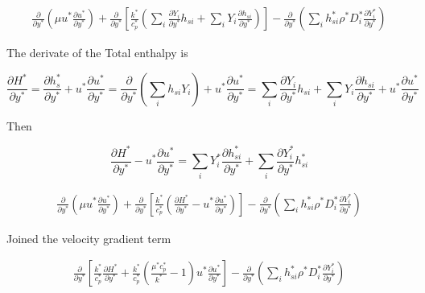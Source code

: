 \begin{equation*} 
\begin{split} 
\frac{\partial}{\partial y^*}
\left(
    \mu
    u^*
    \frac{\partial u^*}{\partial y^*}
\right)
+
\frac{\partial}{\partial y^*}
\left[
    \frac{k^*}{c_p^*}
    \left(
        \sum_i
        \frac{\partial Y_i}{\partial y^*}
        h_{si}
        +
        \sum_i
        Y_i
        \frac{\partial h_{si} }{\partial y^*}
    \right)
\right]
-
\frac{\partial}{\partial y^*}
\left(
        \sum_i
        h_{si}^*
        \rho^* 
        D_i^*
        \frac{\partial Y_i^*}{\partial y^*}
\right)
\end{split} 
\end{equation*} 

The derivate of the Total enthalpy is 

\begin{equation*} 
\frac{\partial H^*}{\partial y^*}
=
\frac{\partial h_{s}^*}{\partial y^*}
+
u^*
\frac{\partial u^*}{\partial y^*}
=
\frac{\partial }{\partial y^*}
\left(
    \sum_ih_{si}Y_i
\right)
+
u^*
\frac{\partial u^*}{\partial y^*}
=
\sum_i
\frac{\partial Y_i}{\partial y^*}
h_{si}
+
\sum_i
Y_i
\frac{\partial h_{si} }{\partial y^*}
+
u^*
\frac{\partial u^*}{\partial y^*}
\end{equation*} 

Then 

\begin{equation*} 
\frac{\partial H^*}{\partial y^*}
-
u^*
\frac{\partial u^*}{\partial y^*}
=
\sum_i
Y_i^*
\frac{\partial h_{si}^* }{\partial y^*}
+
\sum_i
\frac{\partial Y_i^*}{\partial y^*}
h_{si}^*
\end{equation*} 


\begin{equation*} 
\begin{split} 
\frac{\partial}{\partial y^*}
\left(
    \mu
    u^*
    \frac{\partial u^*}{\partial y^*}
\right)
+
\frac{\partial}{\partial y^*}
\left[
    \frac{k^*}{c_p^*}
    \left(
        \frac{\partial H^*}{\partial y^*}
        -
        u^*
        \frac{\partial u^*}{\partial y^*}
    \right)
\right]
-
\frac{\partial}{\partial y^*}
\left(
        \sum_i
        h_{si}^*
        \rho^* 
        D_i^*
        \frac{\partial Y_i^*}{\partial y^*}
\right)
\end{split} 
\end{equation*} 

Joined the velocity gradient term  

\begin{equation*} 
\begin{split} 
\frac{\partial}{\partial y^*}
\left[
    \frac{k^*}{c_p^*}
    \frac{\partial H^*}{\partial y^*}
    +
    \frac{k^*}{c_p^*}
    \left(
        \frac{\mu^*{c_p^*}}{k^*}
        -
        1 
    \right)
    u^*
    \frac{\partial u^*}{\partial y^*}
\right]
-
\frac{\partial}{\partial y^*}
\left(
        \sum_i
        h_{si}^*
        \rho^* 
        D_i^*
        \frac{\partial Y_i^*}{\partial y^*}
\right)
\end{split} 
\end{equation*} 

